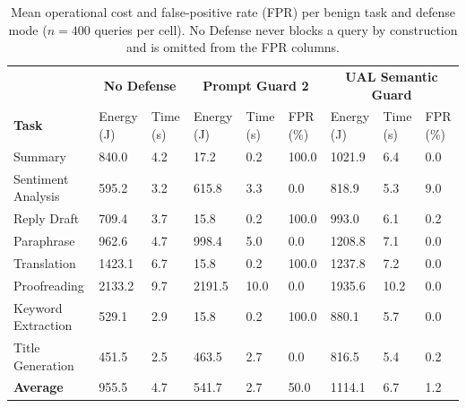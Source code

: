\begin{table}[t]
\small
\centering
\caption{Mean operational cost and false-positive rate (FPR) per benign task and defense mode ($n{=}400$ queries per cell). No Defense never blocks a query by construction and is omitted from the FPR columns.}
\label{tab:cost_benign_task}
\begin{tabularx}{\linewidth}{lXXXXXXXX}
\toprule
& \multicolumn{2}{c}{\textbf{No Defense}} & \multicolumn{3}{c}{\textbf{Prompt Guard 2}} & \multicolumn{3}{c}{\textbf{UAL Semantic Guard}} \\
\textbf{Task} & Energy (J) & Time (s) & Energy (J) & Time (s) & FPR (\%) & Energy (J) & Time (s) & FPR (\%) \\
\midrule
Summary            & 840.0  & 4.2  & 17.2   & 0.2  & 100.0 & 1021.9 & 6.4  & 0.0 \\
Sentiment Analysis & 595.2  & 3.2  & 615.8  & 3.3  & 0.0   & 818.9  & 5.3  & 9.0 \\
Reply Draft        & 709.4  & 3.7  & 15.8   & 0.2  & 100.0 & 993.0  & 6.1  & 0.2 \\
Paraphrase         & 962.6  & 4.7  & 998.4  & 5.0  & 0.0   & 1208.8 & 7.1  & 0.0 \\
Translation        & 1423.1 & 6.7  & 15.8   & 0.2  & 100.0 & 1237.8 & 7.2  & 0.0 \\
Proofreading       & 2133.2 & 9.7  & 2191.5 & 10.0 & 0.0   & 1935.6 & 10.2 & 0.0 \\
Keyword Extraction & 529.1  & 2.9  & 15.8   & 0.2  & 100.0 & 880.1  & 5.7  & 0.0 \\
Title Generation   & 451.5  & 2.5  & 463.5  & 2.7  & 0.0   & 816.5  & 5.4  & 0.2 \\
\midrule
\textbf{Average}   & 955.5  & 4.7  & 541.7  & 2.7  & 50.0  & 1114.1 & 6.7  & 1.2 \\
\bottomrule
\end{tabularx}
\end{table}

